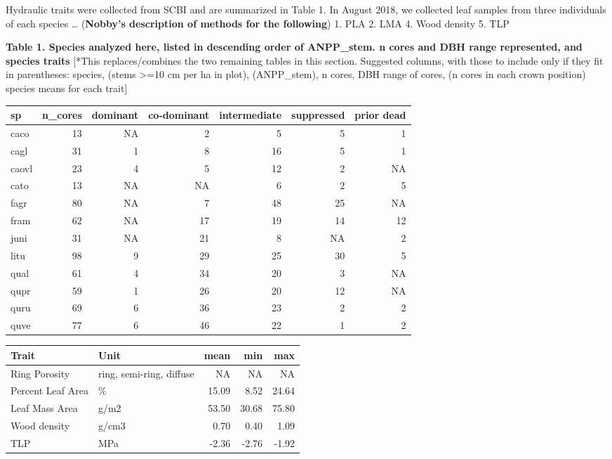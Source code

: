 \documentclass[]{article}
\begin{document}
Hydraulic traits were collected from SCBI and are summarized in Table 1.
In August 2018, we collected leaf samples from three individuals of each
species \ldots{} (\textbf{Nobby's description of methods for the
following}) 1. PLA 2. LMA 4. Wood density 5. TLP

\textbf{Table 1. Species analyzed here, listed in descending order of
ANPP\_stem. n cores and DBH range represented, and species traits}
{[}*This replaces/combines the two remaining tables in this section.
Suggested columns, with those to include only if they fit in
parentheses: species, (stems \textgreater=10 cm per ha in plot),
(ANPP\_stem), n cores, DBH range of cores, (n cores in each crown
position) species means for each trait{]}

\begin{table}[H]
\centering
\begin{tabular}{l|r|r|r|r|r|r}
\hline
sp & n\_cores & dominant & co-dominant & intermediate & suppressed & prior dead\\
\hline
caco & 13 & NA & 2 & 5 & 5 & 1\\
\hline
cagl & 31 & 1 & 8 & 16 & 5 & 1\\
\hline
caovl & 23 & 4 & 5 & 12 & 2 & NA\\
\hline
cato & 13 & NA & NA & 6 & 2 & 5\\
\hline
fagr & 80 & NA & 7 & 48 & 25 & NA\\
\hline
fram & 62 & NA & 17 & 19 & 14 & 12\\
\hline
juni & 31 & NA & 21 & 8 & NA & 2\\
\hline
litu & 98 & 9 & 29 & 25 & 30 & 5\\
\hline
qual & 61 & 4 & 34 & 20 & 3 & NA\\
\hline
qupr & 59 & 1 & 26 & 20 & 12 & NA\\
\hline
quru & 69 & 6 & 36 & 23 & 2 & 2\\
\hline
quve & 77 & 6 & 46 & 22 & 1 & 2\\
\hline
\end{tabular}
\end{table}
\begin{table}[H]
\centering
\begin{tabular}{l|l|r|r|r}
\hline
Trait & Unit & mean & min & max\\
\hline
Ring Porosity & ring, semi-ring, diffuse & NA & NA & NA\\
\hline
Percent Leaf Area & \% & 15.09 & 8.52 & 24.64\\
\hline
Leaf Mass Area & g/m2 & 53.50 & 30.68 & 75.80\\
\hline
Wood density & g/cm3 & 0.70 & 0.40 & 1.09\\
\hline
TLP & MPa & -2.36 & -2.76 & -1.92\\
\hline
\end{tabular}
\end{table}
\end{document}
